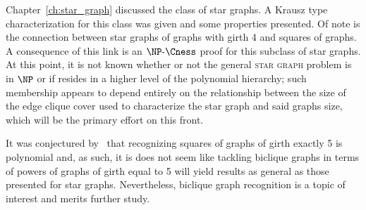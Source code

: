 Chapter~\ref{ch:star_graph} discussed the class of star graphs.
A Krausz type characterization for this class was given and some properties presented.
Of note is the connection between star graphs of graphs with girth 4 and squares of graphs.
A consequence of this link is an $\NPcness$ proof for this subclass of star graphs.
At this point, it is not known whether or not the general \textsc{star graph} problem is in $\NP$ or if resides in a higher level of the polynomial hierarchy;
such membership appears to depend entirely on the relationship between the size of the edge clique cover used to characterize the star graph and said graphs size, which will be the primary effort on this front.

It was conjectured by~\citep{girth_powers} that recognizing squares of graphs of girth exactly 5 is polynomial and, as such, it is does not seem like tackling biclique graphs in terms of powers of graphs of girth equal to 5 will yield results as general as those presented for star graphs.
Nevertheless, biclique graph recognition is a topic of interest and merits further study.
